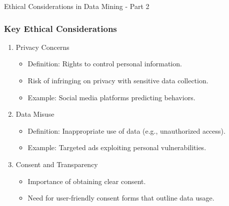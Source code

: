 \documentclass[aspectratio=169]{beamer}
\begin{document}
\begin{frame}[fragile]{Ethical Considerations in Data Mining - Part 2}
    \frametitle{Key Ethical Considerations}
    \begin{enumerate}
        \item Privacy Concerns
            \begin{itemize}
                \item Definition: Rights to control personal information.
                \item Risk of infringing on privacy with sensitive data collection.
                \item Example: Social media platforms predicting behaviors.
            \end{itemize}
        \item Data Misuse
            \begin{itemize}
                \item Definition: Inappropriate use of data (e.g., unauthorized access).
                \item Example: Targeted ads exploiting personal vulnerabilities.
            \end{itemize}
        \item Consent and Transparency
            \begin{itemize}
                \item Importance of obtaining clear consent.
                \item Need for user-friendly consent forms that outline data usage.
            \end{itemize}
    \end{enumerate}
\end{frame}
\end{document}
